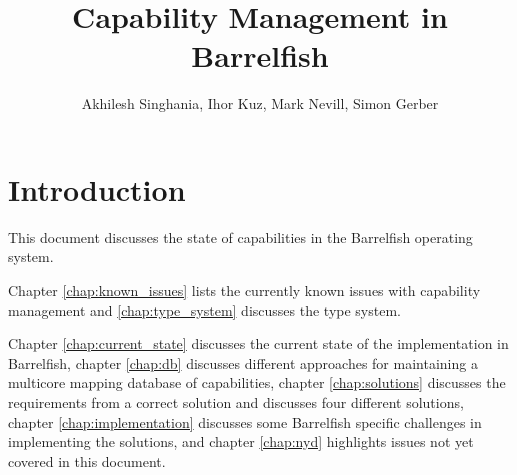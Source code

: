 \documentclass[a4paper,twoside]{report} %
\title{Capability Management in Barrelfish}   %
\author{Akhilesh Singhania, Ihor Kuz, Mark Nevill, Simon Gerber}	%
\begin{document}
\maketitle

%
%
\begin{versionhistory}
\end{versionhistory}


\chapter{Introduction}

This document discusses the state of capabilities in the Barrelfish
operating system.

Chapter \ref{chap:known_issues} lists the currently known issues with
capability management and \ref{chap:type_system} discusses the type
system.

Chapter \ref{chap:current_state} discusses the current state of the
implementation in Barrelfish, chapter \ref{chap:db} discusses
different approaches for maintaining a multicore mapping database of
capabilities, chapter \ref{chap:solutions} discusses the requirements
from a correct solution and discusses four different solutions,
chapter \ref{chap:implementation} discusses some Barrelfish specific
challenges in implementing the solutions, and chapter \ref{chap:nyd}
highlights issues not yet covered in this document.

\end{document}
